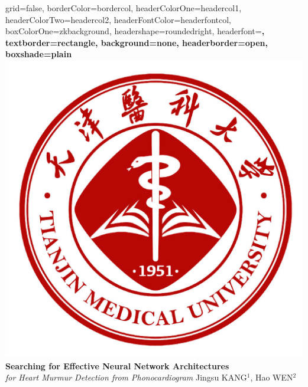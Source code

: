 \documentclass[a0paper,portrait]{baposter}
\begin{document}

\begin{poster}{
grid=false,
borderColor=bordercol, %
headerColorOne=headercol1, %
headerColorTwo=headercol2, %
headerFontColor=headerfontcol, %
boxColorOne=zkbackground,
headershape=roundedright, %
headerfont=\Large\sf\bf, %
textborder=rectangle,
background=none,
headerborder=open, %
boxshade=plain
}
%
%
{\includegraphics[scale=0.092]{logo_tmu.jpeg}}
{
{\bf \fontsize{19pt}{19pt} \selectfont Searching for Effective Neural Network Architectures} \\
{\it \LARGE  for Heart Murmur Detection from Phonocardiogram}
} %
{\vspace{0.3em} \smaller Jingsu KANG$^1$, Hao WEN$^2$  \\  %
  
}
\end{poster}
\end{document}
